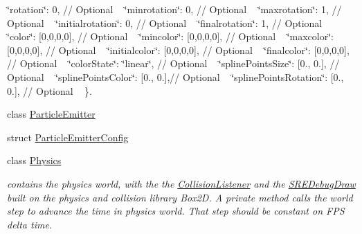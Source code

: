 \begin{DoxyCompactItemize}
\begin{DoxyCompactList}
 \char`\"{}rotation\char`\"{}\+: 0, // Optional ~\newline
 \char`\"{}minrotation\char`\"{}\+: 0, // Optional ~\newline
 \char`\"{}maxrotation\char`\"{}\+: 1, // Optional ~\newline
 \char`\"{}initialrotation\char`\"{}\+: 0, // Optional ~\newline
 \char`\"{}finalrotation\char`\"{}\+: 1, // Optional ~\newline
 \char`\"{}color\char`\"{}\+: \mbox{[}0,0,0,0\mbox{]}, // Optional ~\newline
 \char`\"{}mincolor\char`\"{}\+: \mbox{[}0,0,0,0\mbox{]}, // Optional ~\newline
 \char`\"{}maxcolor\char`\"{}\+: \mbox{[}0,0,0,0\mbox{]}, // Optional ~\newline
 \char`\"{}initialcolor\char`\"{}\+: \mbox{[}0,0,0,0\mbox{]}, // Optional ~\newline
 \char`\"{}finalcolor\char`\"{}\+: \mbox{[}0,0,0,0\mbox{]}, // Optional ~\newline
 \char`\"{}color\+State\char`\"{}\+: \char`\"{}linear\char`\"{}, // Optional ~\newline
 \char`\"{}spline\+Points\+Size\char`\"{}\+: \mbox{[}0., 0.\mbox{]}, // Optional ~\newline
 \char`\"{}spline\+Points\+Color\char`\"{}\+: \mbox{[}0., 0.\mbox{]},// Optional ~\newline
 \char`\"{}spline\+Points\+Rotation\char`\"{}\+: \mbox{[}0., 0.\mbox{]}, // Optional ~\newline
 \}. \end{DoxyCompactList}\item 
class \hyperlink{class_mason_1_1_particle_emitter}{Particle\+Emitter}
\item 
struct \hyperlink{struct_mason_1_1_particle_emitter_config}{Particle\+Emitter\+Config}
\item 
class \hyperlink{class_mason_1_1_physics}{Physics}
\begin{DoxyCompactList}\small\item\em contains the physics world, with the the \hyperlink{class_mason_1_1_collision_listener}{Collision\+Listener} and the \hyperlink{class_mason_1_1_s_r_e_debug_draw}{S\+R\+E\+Debug\+Draw} built on the physics and collision library Box2D. A private method calls the world step to advance the time in physics world. That step should be constant on F\+PS delta time. \end{DoxyCompactList}\item 

\end{DoxyCompactItemize}
